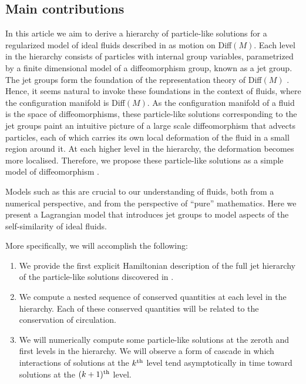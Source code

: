 \documentclass[12pt]{amsart}
\begin{document}
\subsection{Main contributions}
In this article we aim to derive a hierarchy of particle-like
solutions for a regularized model of ideal fluids described in  \cite{MumfordMichor2013} as motion on Diff$(M)$.
Each level in the hierarchy consists of particles
with internal group variables, parametrized by
a finite dimensional model of a diffeomorphism group,
known as a jet group. The jet groups form the foundation of the representation theory of Diff$(M)$ \cite{Kirilov?}. Hence, it seems natural to invoke these
foundations in the context of fluids, where the configuration manifold is Diff$(M)$.
As the configuration manifold of a fluid is the space of
 diffeomorphisms, these particle-like solutions corresponding to the jet groups paint an intuitive picture of a large scale diffeomorphism that advects particles,
each of which carries its own local deformation of the fluid in a small region around it.
At each higher level in the hierarchy, the deformation becomes more localised. 
Therefore, we propose these particle-like solutions as a simple model
of diffeomorphism .

 Models such as this are crucial to our understanding of fluids,
  both from a numerical perspective, and from the perspective
  of ``pure'' mathematics.
  Here we present a Lagrangian model that introduces jet groups to model aspects
  of the self-similarity of ideal fluids.

More specifically, we will accomplish the following:
\begin{enumerate}
  \item We provide the first explicit Hamiltonian description of the full jet hierarchy of the particle-like solutions discovered in 
  	\cite{JacobsRatiuDesbrun2013,CotterHolmJacobsMeier2014}.
  \item We compute a nested sequence of conserved quantities at 
    each level in the hierarchy.
    Each of these conserved quantities will be related to the conservation
    of circulation.
  \item We will numerically compute some particle-like solutions at the zeroth and first levels in the hierarchy.  We will observe a form of cascade in which interactions of solutions at the $k^{\rm th}$ level tend asymptotically in time toward solutions at the $(k+1)^{\rm th}$ level.
\end{enumerate}
\end{document}

